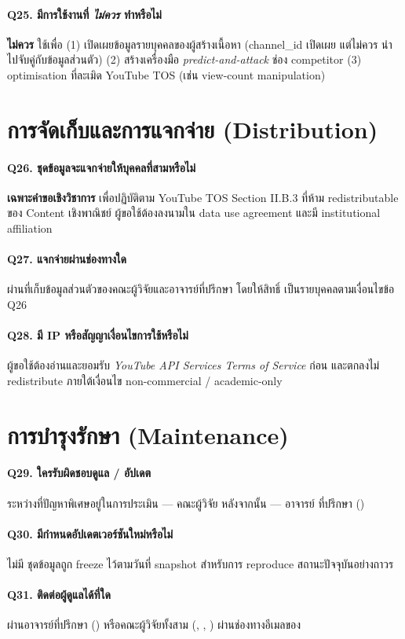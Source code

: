 \paragraph{Q25. มีการใช้งานที่ \emph{ไม่ควร} ทำหรือไม่}
\textbf{ไม่ควร} ใช้เพื่อ
(1) เปิดเผยข้อมูลรายบุคคลของผู้สร้างเนื้อหา (channel\_id เปิดเผย แต่ไม่ควร
นำไปจับคู่กับข้อมูลส่วนตัว) (2) สร้างเครื่องมือ \emph{predict-and-attack}
ช่อง competitor (3) optimisation ที่ละเมิด YouTube TOS (เช่น
view-count manipulation)

\section{การจัดเก็บและการแจกจ่าย (Distribution)}

\paragraph{Q26. ชุดข้อมูลจะแจกจ่ายให้บุคคลที่สามหรือไม่}
\textbf{เฉพาะคำขอเชิงวิชาการ} เพื่อปฏิบัติตาม YouTube TOS Section II.B.3
ที่ห้าม redistributable ของ Content เชิงพาณิชย์ ผู้ขอใช้ต้องลงนามใน data
use agreement และมี institutional affiliation

\paragraph{Q27. แจกจ่ายผ่านช่องทางใด}
ผ่านที่เก็บข้อมูลส่วนตัวของคณะผู้วิจัยและอาจารย์ที่ปรึกษา โดยให้สิทธิ์
เป็นรายบุคคลตามเงื่อนไขข้อ Q26

\paragraph{Q28. มี IP หรือสัญญาเงื่อนไขการใช้หรือไม่}
ผู้ขอใช้ต้องอ่านและยอมรับ \emph{YouTube API Services Terms of Service} ก่อน
และตกลงไม่ redistribute ภายใต้เงื่อนไข non-commercial / academic-only

\section{การบำรุงรักษา (Maintenance)}

\paragraph{Q29. ใครรับผิดชอบดูแล / อัปเดต}
ระหว่างที่ปัญหาพิเศษอยู่ในการประเมิน — คณะผู้วิจัย หลังจากนั้น — อาจารย์
ที่ปรึกษา (\advisor)

\paragraph{Q30. มีกำหนดอัปเดตเวอร์ชันใหม่หรือไม่}
ไม่มี ชุดข้อมูลถูก freeze ไว้ตามวันที่ snapshot สำหรับการ reproduce
สถานะปัจจุบันอย่างถาวร

\paragraph{Q31. ติดต่อผู้ดูแลได้ที่ใด}
ผ่านอาจารย์ที่ปรึกษา (\advisor) หรือคณะผู้วิจัยทั้งสาม
(\authorone, \authortwo, \authorthree) ผ่านช่องทางอีเมลของ
\school\ \university
